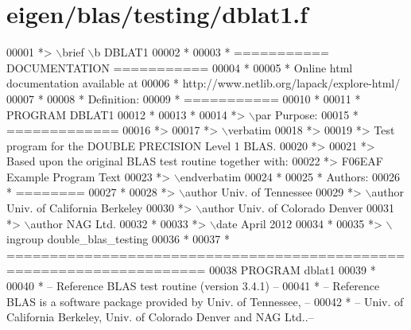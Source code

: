 \hypertarget{eigen_2blas_2testing_2dblat1_8f_source}{}\section{eigen/blas/testing/dblat1.f}
\label{eigen_2blas_2testing_2dblat1_8f_source}

\begin{DoxyCode}
00001 \textcolor{comment}{*> \(\backslash\)brief \(\backslash\)b DBLAT1}
00002 \textcolor{comment}{*}
00003 \textcolor{comment}{*  =========== DOCUMENTATION ===========}
00004 \textcolor{comment}{*}
00005 \textcolor{comment}{* Online html documentation available at }
00006 \textcolor{comment}{*            http://www.netlib.org/lapack/explore-html/ }
00007 \textcolor{comment}{*}
00008 \textcolor{comment}{*  Definition:}
00009 \textcolor{comment}{*  ===========}
00010 \textcolor{comment}{*}
00011 \textcolor{comment}{*       PROGRAM DBLAT1}
00012 \textcolor{comment}{* }
00013 \textcolor{comment}{*}
00014 \textcolor{comment}{*> \(\backslash\)par Purpose:}
00015 \textcolor{comment}{*  =============}
00016 \textcolor{comment}{*>}
00017 \textcolor{comment}{*> \(\backslash\)verbatim}
00018 \textcolor{comment}{*>}
00019 \textcolor{comment}{*>    Test program for the DOUBLE PRECISION Level 1 BLAS.}
00020 \textcolor{comment}{*>}
00021 \textcolor{comment}{*>    Based upon the original BLAS test routine together with:}
00022 \textcolor{comment}{*>    F06EAF Example Program Text}
00023 \textcolor{comment}{*> \(\backslash\)endverbatim}
00024 \textcolor{comment}{*}
00025 \textcolor{comment}{*  Authors:}
00026 \textcolor{comment}{*  ========}
00027 \textcolor{comment}{*}
00028 \textcolor{comment}{*> \(\backslash\)author Univ. of Tennessee }
00029 \textcolor{comment}{*> \(\backslash\)author Univ. of California Berkeley }
00030 \textcolor{comment}{*> \(\backslash\)author Univ. of Colorado Denver }
00031 \textcolor{comment}{*> \(\backslash\)author NAG Ltd. }
00032 \textcolor{comment}{*}
00033 \textcolor{comment}{*> \(\backslash\)date April 2012}
00034 \textcolor{comment}{*}
00035 \textcolor{comment}{*> \(\backslash\)ingroup double\_blas\_testing}
00036 \textcolor{comment}{*}
00037 \textcolor{comment}{*  =====================================================================}
00038       \textcolor{keyword}{PROGRAM} dblat1
00039 \textcolor{comment}{*}
00040 \textcolor{comment}{*  -- Reference BLAS test routine (version 3.4.1) --}
00041 \textcolor{comment}{*  -- Reference BLAS is a software package provided by Univ. of Tennessee,    --}
00042 \textcolor{comment}{*  -- Univ. of California Berkeley, Univ. of Colorado Denver and NAG Ltd..--}

\end{DoxyCode}
